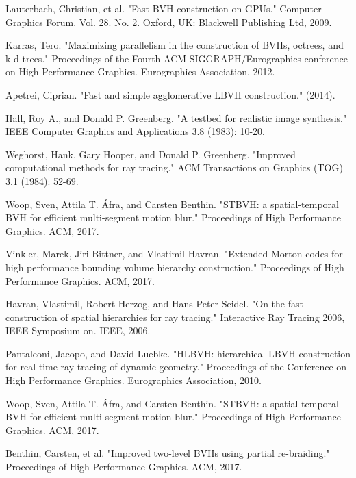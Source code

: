 \documentclass[11pt]{article}
\begin{document}
\begin{thebibliography}{3}
 Lauterbach, Christian, et al. "Fast BVH construction on GPUs." Computer Graphics Forum. Vol. 28. No. 2. Oxford, UK: Blackwell Publishing Ltd, 2009.

 Karras, Tero. "Maximizing parallelism in the construction of BVHs, octrees, and k-d trees." Proceedings of the Fourth ACM SIGGRAPH/Eurographics conference on High-Performance Graphics. Eurographics Association, 2012.

 Apetrei, Ciprian. "Fast and simple agglomerative LBVH construction." (2014).


 Hall, Roy A., and Donald P. Greenberg. "A testbed for realistic image synthesis." IEEE Computer Graphics and Applications 3.8 (1983): 10-20.

Weghorst, Hank, Gary Hooper, and Donald P. Greenberg. "Improved computational methods for ray tracing." ACM Transactions on Graphics (TOG) 3.1 (1984): 52-69.



 Woop, Sven, Attila T. Áfra, and Carsten Benthin. "STBVH: a spatial-temporal BVH for efficient multi-segment motion blur." Proceedings of High Performance Graphics. ACM, 2017.

 Vinkler, Marek, Jiri Bittner, and Vlastimil Havran. "Extended Morton codes for high performance bounding volume hierarchy construction." Proceedings of High Performance Graphics. ACM, 2017.

 Havran, Vlastimil, Robert Herzog, and Hans-Peter Seidel. "On the fast construction of spatial hierarchies for ray tracing." Interactive Ray Tracing 2006, IEEE Symposium on. IEEE, 2006.



 Pantaleoni, Jacopo, and David Luebke. "HLBVH: hierarchical LBVH construction for real-time ray tracing of dynamic geometry." Proceedings of the Conference on High Performance Graphics. Eurographics Association, 2010.

 Woop, Sven, Attila T. Áfra, and Carsten Benthin. "STBVH: a spatial-temporal BVH for efficient multi-segment motion blur." Proceedings of High Performance Graphics. ACM, 2017.

 Benthin, Carsten, et al. "Improved two-level BVHs using partial re-braiding." Proceedings of High Performance Graphics. ACM, 2017.


\end{thebibliography}
\end{document}
